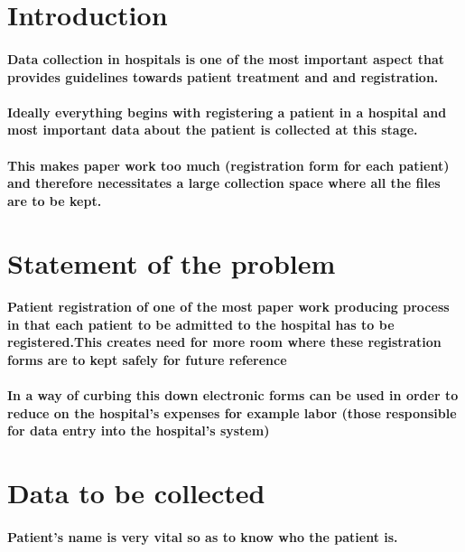 \documentclass[10pt,a4paper]{article}
\begin{document}
\section{Introduction}
\paragraph{Data collection in hospitals is one of the most important aspect that provides guidelines towards patient treatment and  and registration.}
\paragraph{Ideally everything begins with registering a patient in a hospital and most important data about the patient is collected at this stage.}
\paragraph{This makes paper work too much (registration form for each patient) and therefore necessitates a large collection space where all the files are to be kept.}

\section{Statement of the problem}
\paragraph{Patient registration of one of the most paper work producing process in that each patient to be admitted to the hospital has to be registered.This creates need for more room where these registration forms are to kept safely for future reference}
\paragraph{In a way of curbing this down electronic forms can be used in order to reduce on the hospital's expenses for example labor (those responsible for data entry into the hospital's system)}

\section{Data to be collected}
\paragraph{Patient's name is very vital so as to know who the patient is.} 
\end{document}
